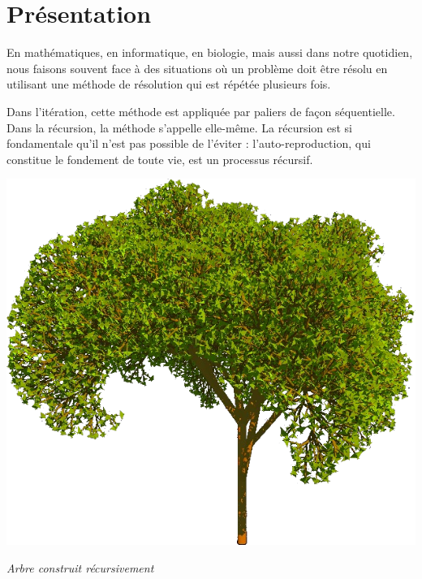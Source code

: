 \documentclass[10pt,fleqn]{article} %
\begin{document}


\section{Présentation}
\noindent\begin{minipage}[c]{.65\linewidth}
En mathématiques, en informatique, en biologie, mais aussi dans notre quotidien, nous faisons souvent face à des situations où un problème doit être résolu en utilisant une méthode de résolution qui est répétée plusieurs fois. 

Dans l'itération, cette méthode est appliquée par paliers de façon séquentielle. Dans la récursion, la méthode s’appelle elle-même. La récursion est si fondamentale qu’il n’est pas possible de l’éviter : l'auto-reproduction, qui constitue le fondement de toute vie, est un processus récursif.

\end{minipage} \hfill
\begin{minipage}[c]{.3\linewidth}
\begin{center}
\includegraphics[width=\textwidth]{images/arbre}

\textit{Arbre construit récursivement \cite{4}}
\end{center}
\end{minipage}
\end{document}
